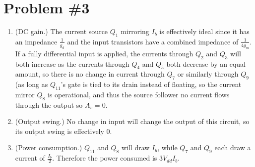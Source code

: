 \documentclass{article}
\begin{document}
\section*{Problem \#3}
\begin{enumerate}
\item{(DC gain.)
The current source $Q_1$ mirroring $I_b$ is effectively ideal since it has
an impedance $\frac{1}{g_d}$ and the input transistors have a combined 
impedance of $\frac{1}{4g_m}$.
If a fully differential input is applied, the currents through $Q_2$ and
$Q_3$ will both increase as the currents through $Q_4$ and $Q_5$ both 
decrease by an equal amount, so there is no change in 
current through $Q_7$ or similarly through $Q_9$ (as long as $Q_{11}$'s 
gate is tied to its drain instead of floating, so the current mirror 
$Q_8$ is operational, and thus the source follower no current flows
through the output so $A_v = 0$.
}
\item{(Output swing.)
No change in input will change the output of this circuit, so its output
swing is effectively 0.
}
\item{(Power consumption.)
$Q_{11}$ and $Q_8$ will draw $I_b$, while $Q_7$ and $Q_9$ each draw a current of 
$\frac{I_b}{2}$. Therefore the power consumed is $3 V_{dd} I_b$.
}
\end{enumerate}
\end{document}
